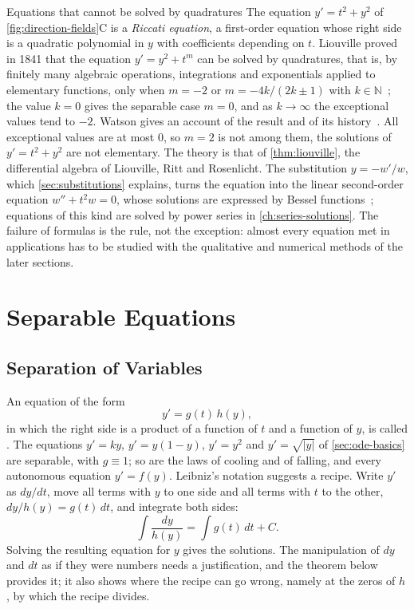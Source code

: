 \begin{note}{Equations that cannot be solved by quadratures}
The equation $y'=t^2+y^2$ of \cref{fig:direction-fields}C is a \emph{Riccati equation}, a first-order equation whose right side is a quadratic polynomial in $y$ with coefficients depending on $t$. Liouville proved in 1841 that the equation $y'=y^2+t^m$ can be solved by quadratures, that is, by finitely many algebraic operations, integrations and exponentials applied to elementary functions, only when $m=-2$ or $m=-4k/(2k\pm1)$ with $k\in\mathbb N$~\cite{liouville1841}; the value $k=0$ gives the separable case $m=0$, and as $k\to\infty$ the exceptional values tend to $-2$. Watson gives an account of the result and of its history~\cite[Chap.~IV]{watson1944}. All exceptional values are at most $0$, so $m=2$ is not among them, the solutions of $y'=t^2+y^2$ are not elementary. The theory is that of \cref{thm:liouville}, the differential algebra of Liouville, Ritt and Rosenlicht. The substitution $y=-w'/w$, which \cref{sec:substitutions} explains, turns the equation into the linear second-order equation $w''+t^2w=0$, whose solutions are expressed by Bessel functions~\cite[Chap.~IV]{watson1944}; equations of this kind are solved by power series in \cref{ch:series-solutions}. The failure of formulas is the rule, not the exception: almost every equation met in applications has to be studied with the qualitative and numerical methods of the later sections.
\end{note}

\section{Separable Equations}
\label{sec:separable}

\subsection{Separation of Variables}

An equation of the form
\begin{equation}
y'=g(t)\,h(y),
\label{eq:separable}
\end{equation}
in which the right side is a product of a function of $t$ and a function of $y$, is called . The equations $y'=ky$, $y'=y(1-y)$, $y'=y^2$ and $y'=\sqrt{|y|}$ of \cref{sec:ode-basics} are separable, with $g\equiv1$; so are the laws of cooling and of falling, and every autonomous equation $y'=f(y)$. Leibniz's notation suggests a recipe. Write $y'$ as $dy/dt$, move all terms with $y$ to one side and all terms with $t$ to the other, $dy/h(y)=g(t)\,dt$, and integrate both sides:
\[
\int\frac{dy}{h(y)}=\int g(t)\,dt+C .
\]
Solving the resulting equation for $y$ gives the solutions. The manipulation of $dy$ and $dt$ as if they were numbers needs a justification, and the theorem below provides it; it also shows where the recipe can go wrong, namely at the zeros of $h$, by which the recipe divides.

